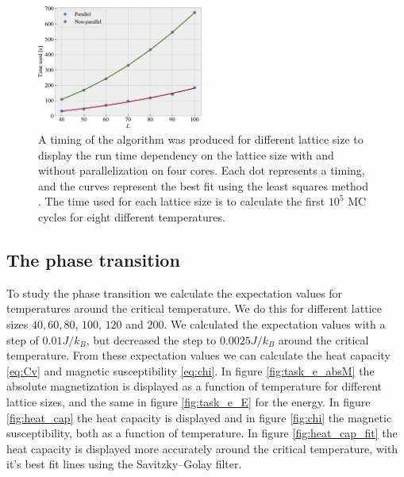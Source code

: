 \documentclass[%
 reprint,
nofootinbib,
aps,
]{revtex4-1}
\begin{document}
\begin{figure}
  \centering
  \includegraphics[width=0.485\textwidth]{../figures/timer.pdf}
  \caption{A timing of the algorithm was produced for different lattice size to display the run time dependency on the lattice size with and without parallelization on four cores. Each dot represents a timing, and the curves represent the best fit using the least squares method \cite{squires}. The time used for each lattice size is to calculate the first $10^5$ MC cycles for eight different temperatures.}
  \label{fig:timer}
\end{figure}

\subsection{The phase transition}
To study the phase transition we calculate the expectation values for temperatures around the critical temperature. We do this for different lattice sizes $40, 60, 80$, $100$, $120$ and $200$. We calculated the expectation values with a step of $0.01J/k_B$, but decreased the step to $0.0025J/k_B$ around the critical temperature. From these expectation values we can calculate the heat capacity \eqref{eq:Cv} and magnetic susceptibility \eqref{eq:chi}.
In figure \vref{fig:task_e_absM} the absolute magnetization is displayed as a function of temperature for different lattice sizes, and the same in figure \vref{fig:task_e_E} for the energy. In figure \vref{fig:heat_cap} the heat capacity is displayed and in figure \vref{fig:chi} the magnetic susceptibility, both as a function of temperature. In figure \vref{fig:heat_cap_fit} the heat capacity is displayed more accurately around the critical temperature, with it's best fit lines using the Savitzky–Golay filter.\\
\end{document}
